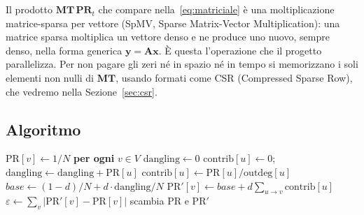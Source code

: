 \documentclass[11pt,a4paper]{article}
\newcommand{\stacco}{\par\medskip\noindent}
\begin{document}
\stacco
Il prodotto $\mathbf{MT}\,\mathbf{PR}_t$ che compare
nella~\eqref{eq:matriciale} è una moltiplicazione matrice-sparsa per vettore
(SpMV, Sparse Matrix-Vector Multiplication): una matrice sparsa moltiplica
un vettore denso e ne produce uno nuovo, sempre denso, nella forma generica
$\mathbf{y}=\mathbf{A}\mathbf{x}$. È questa l'operazione che il progetto
parallelizza. Per non pagare gli zeri né in spazio né in tempo si
memorizzano i soli elementi non nulli di $\mathbf{MT}$, usando formati come
CSR (Compressed Sparse Row), che vedremo nella Sezione~\ref{sec:csr}.

\subsection{Algoritmo}
\begin{algorithm}[H]
\caption{PageRank per iterazione di potenza (formulazione \emph{pull})}
\label{alg:seq}
\begin{algorithmic}[1]
\State $\mathrm{PR}[v] \gets 1/N$ \textbf{per ogni} $v \in V$
\Repeat
  \State $\mathrm{dangling} \gets 0$
      \State $\mathrm{contrib}[u] \gets 0$; \quad $\mathrm{dangling} \gets \mathrm{dangling} + \mathrm{PR}[u]$
    \Else
      \State $\mathrm{contrib}[u] \gets \mathrm{PR}[u]/\mathrm{outdeg}[u]$
    \EndIf
  \EndFor
  \State $\mathit{base} \gets (1-d)/N + d\cdot \mathrm{dangling}/N$
    \State $\mathrm{PR}'[v] \gets \mathit{base} + d \sum_{u \to v} \mathrm{contrib}[u]$
  \EndFor
  \State $\varepsilon \gets \sum_v |\mathrm{PR}'[v]-\mathrm{PR}[v]|$
  \State scambia $\mathrm{PR}$ e $\mathrm{PR}'$
\end{algorithmic}
\end{algorithm}
\end{document}
